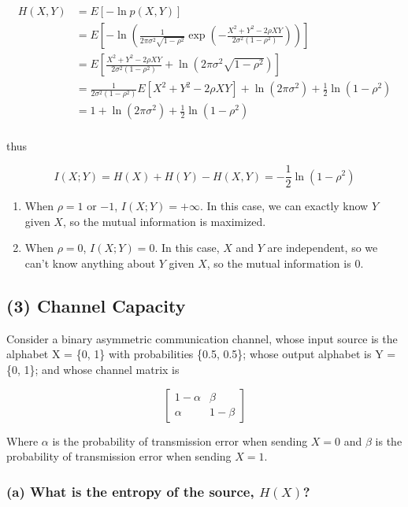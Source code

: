 \[
\begin{aligned}
H(X,Y)
&=E[-\ln p(X,Y)]\\
&=E\left[-\ln\left(\frac{1}{2\pi\sigma^2\sqrt{1-\rho^2}}\exp\left(-\frac{X^2+Y^2-2\rho XY}{2\sigma^2(1-\rho^2)}\right)\right)\right]\\
&=E\left[\frac{X^2+Y^2-2\rho XY}{2\sigma^2(1-\rho^2)}+\ln(2\pi\sigma^2\sqrt{1-\rho^2})\right]\\
&=\frac1{2\sigma^2(1-\rho^2)}E[X^2+Y^2-2\rho XY]+\ln(2\pi\sigma^2)+\frac12\ln(1-\rho^2)\\
&=1+\ln(2\pi\sigma^2)+\frac12\ln(1-\rho^2)\\
\end{aligned}
\]

thus

\[
I(X;Y)=H(X)+H(Y)-H(X,Y)=-\frac12\ln(1-\rho^2)
\]

\begin{enumerate}
\def\labelenumi{\arabic{enumi}.}
\tightlist
\item
  When \(\rho=1\) or \(-1\), \(I(X;Y)=+\infty\). In this case, we can
  exactly know \(Y\) given \(X\), so the mutual information is
  maximized.
\item
  When \(\rho=0\), \(I(X;Y)=0\). In this case, \(X\) and \(Y\) are
  independent, so we can't know anything about \(Y\) given \(X\), so the
  mutual information is 0.
\end{enumerate}

\hypertarget{channel-capacity}{%
\subsection{(3) Channel Capacity}\label{channel-capacity}}

Consider a binary asymmetric communication channel, whose input source
is the alphabet X = \{0, 1\} with probabilities \{0.5, 0.5\}; whose
output alphabet is Y = \{0, 1\}; and whose channel matrix is

\[
\begin{bmatrix}
1-\alpha&\beta\\
\alpha&1-\beta
\end{bmatrix}
\]

Where \(\alpha\) is the probability of transmission error when sending
\(X=0\) and \(\beta\) is the probability of transmission error when
sending \(X=1\).

\hypertarget{a-what-is-the-entropy-of-the-source-hx}{%
\subsubsection{\texorpdfstring{(a) What is the entropy of the source,
\(H(X)\)?}{(a) What is the entropy of the source, H(X)?}}\label{a-what-is-the-entropy-of-the-source-hx}}

